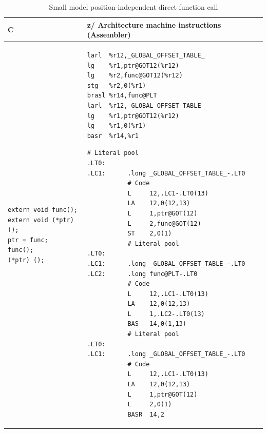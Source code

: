 \documentclass[USenglish,fontsize=11pt,twoside,%
  toc=bib,toc=idx,toc=graduated,numbers=noendperiod,
  bookmarks=true,
  bookmarksnumbered=true,
  bookmarksopen=true,
  bookmarksopenlevel=1,
  breaklinks=true,
  colorlinks=true,
  linkcolor=black,
  pdfpagelayout={TwoPageRight},
  pdfusetitle=true
]{scrreprt}
\newcommand{\ARCH}{z/\kern-1pt Ar\-chi\-tec\-ture}
\newcommand{\ARCH}{ESA/390}
\newenvironment{DIFnomarkup}{}{} %
\begin{document}
\begin{table}
  \centering
  \begin{DIFnomarkup}
  \begin{tabular}{p{}p{}}
    \toprule
    C & \ARCH{} machine instructions (Assembler) \\
    \midrule
\begin{lstlisting}[style=short]
extern void func();
extern void (*ptr)();
ptr = func;
func();
(*ptr) ();
\end{lstlisting}
    &
\ifzseries
\begin{lstlisting}[style=short,language=simpleasm]
larl  %r12,_GLOBAL_OFFSET_TABLE_
lg    %r1,ptr@GOT12(%r12)
lg    %r2,func@GOT12(%r12)
stg   %r2,0(%r1)
brasl %r14,func@PLT
larl  %r12,_GLOBAL_OFFSET_TABLE_
lg    %r1,ptr@GOT12(%r12)
lg    %r1,0(%r1)
basr  %r14,%r1
\end{lstlisting}
\else
\begin{lstlisting}[style=short,language=simpleasm]
           # Literal pool
.LT0:
.LC1:      .long _GLOBAL_OFFSET_TABLE_-.LT0
           # Code
           L     12,.LC1-.LT0(13)
           LA    12,0(12,13)
           L     1,ptr@GOT(12)
           L     2,func@GOT(12)
           ST    2,0(1)
           # Literal pool
.LT0:
.LC1:      .long _GLOBAL_OFFSET_TABLE_-.LT0
.LC2:      .long func@PLT-.LT0
           # Code
           L     12,.LC1-.LT0(13)
           LA    12,0(12,13)
           L     1,.LC2-.LT0(13)
           BAS   14,0(1,13)
           # Literal pool
.LT0:
.LC1:      .long _GLOBAL_OFFSET_TABLE_-.LT0
           # Code
           L     12,.LC1-.LT0(13)
           LA    12,0(12,13)
           L     1,ptr@GOT(12)
           L     2,0(1)
           BASR  14,2
\end{lstlisting}
\fi \\
    \bottomrule
  \end{tabular}
  \end{DIFnomarkup}
  \caption{Small model position-independent {\ifzseries\else direct\fi}
    function call}
  \label{tab:fnsmalldirect}
\end{table}
\end{document}
